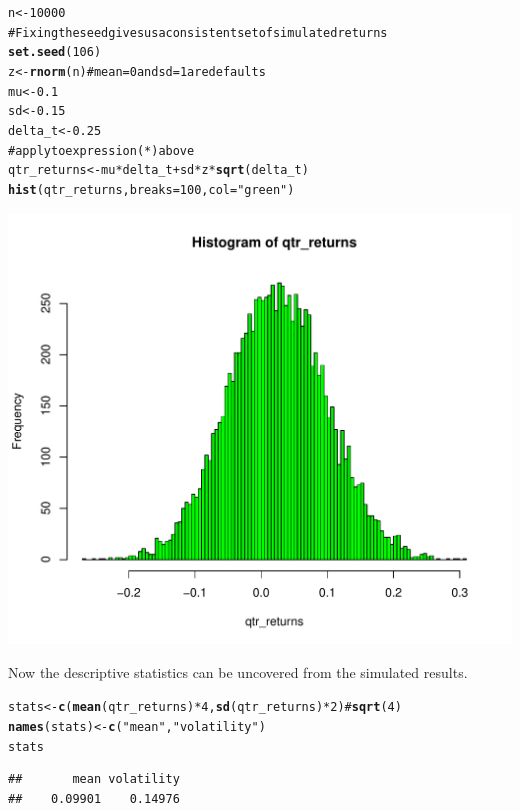 \documentclass[12pt, a4paper, oneside]{article}\usepackage{graphicx, color}
\makeatletter
\def\maxwidth{ %
  \ifdim\Gin@nat@width>\linewidth
    \linewidth
  \else
    \Gin@nat@width
  \fi
}
\newcommand{\hlfunctioncall}[1]{\textcolor[rgb]{0.501960784313725,0,0.329411764705882}{\textbf{#1}}}%
\newcommand{\hlstring}[1]{\textcolor[rgb]{0.6,0.6,1}{#1}}%
\newcommand{\hlcomment}[1]{\textcolor[rgb]{0.180392156862745,0.6,0.341176470588235}{#1}}%
\newenvironment{kframe}{%
 \def\at@end@of@kframe{}%
 \ifinner\ifhmode%
  \def\at@end@of@kframe{\end{minipage}}%
  \begin{minipage}{\columnwidth}%
 \fi\fi%
 \def\FrameCommand##1{\hskip\@totalleftmargin \hskip-\fboxsep
 \colorbox{shadecolor}{##1}\hskip-\fboxsep
     \hskip-\linewidth \hskip-\@totalleftmargin \hskip\columnwidth}%
 \MakeFramed {\advance\hsize-\width
   \@totalleftmargin\z@ \linewidth\hsize
   \@setminipage}}%
 {\par\unskip\endMakeFramed%
 \at@end@of@kframe}
\newenvironment{knitrout}{}{} %
\makeatother
\begin{document}
\begin{knitrout}
\color{fgcolor}\begin{kframe}
\begin{alltt}
n <- 10000
\hlcomment{# Fixing the seed gives us a consistent set of simulated returns}
\hlfunctioncall{set.seed}(106)
z <- \hlfunctioncall{rnorm}(n)  \hlcomment{# mean = 0 and sd = 1 are defaults}
mu <- 0.1
sd <- 0.15
delta_t <- 0.25
\hlcomment{# apply to expression (*) above}
qtr_returns <- mu * delta_t + sd * z * \hlfunctioncall{sqrt}(delta_t)
\hlfunctioncall{hist}(qtr_returns, breaks = 100, col = \hlstring{"green"})
\end{alltt}
\end{kframe}
\includegraphics[width=\maxwidth]{figure/MC} 

\end{knitrout}


Now the descriptive statistics can be uncovered from the simulated results. 
\begin{knitrout}
\color{fgcolor}\begin{kframe}
\begin{alltt}
stats <- \hlfunctioncall{c}(\hlfunctioncall{mean}(qtr_returns) * 4, \hlfunctioncall{sd}(qtr_returns) * 2)  \hlcomment{# \hlfunctioncall{sqrt}(4)}
\hlfunctioncall{names}(stats) <- \hlfunctioncall{c}(\hlstring{"mean"}, \hlstring{"volatility"})
stats
\end{alltt}
\begin{verbatim}
##       mean volatility 
##    0.09901    0.14976
\end{verbatim}
\end{kframe}
\end{knitrout}
\end{document}
